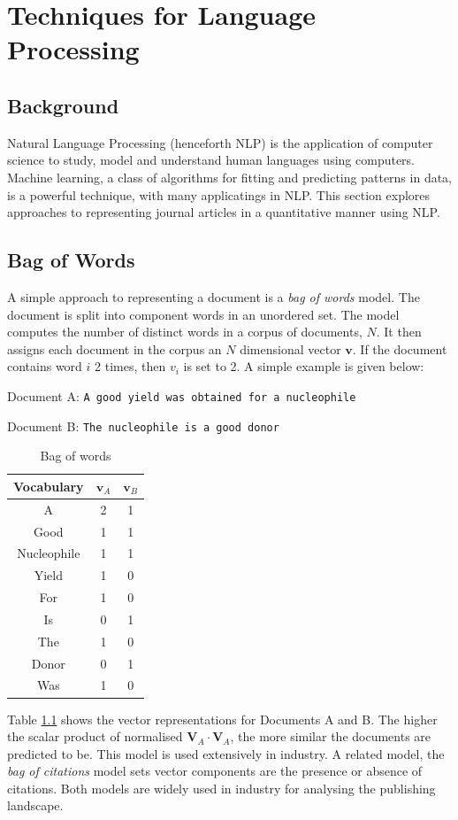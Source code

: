 \chapter{Techniques for Language Processing}
\label{chapt:NLP}
\section{Background}
Natural Language Processing (henceforth NLP) is the application of computer science to study, model and understand human languages using computers. Machine learning, a class of algorithms for fitting and predicting patterns in data, is a powerful technique, with many applicatings in NLP. This section explores approaches to representing journal articles in a quantitative manner using NLP.
\section{Bag of Words}
A simple approach to representing a document is a \emph{bag of words} model. The document is split into component words in an unordered set. The model computes the number of distinct words in a corpus of documents, $N$. It then assigns each document in the corpus an $N$ dimensional vector $\mathbf{v}$. If the document contains word $i$ 2 times, then $v_{i}$ is set to 2. A simple example is given below:

Document A: \texttt{A good yield was obtained for a nucleophile}

Document B: \texttt{The nucleophile is a good donor}
\begin{table}[H]
\label{tab:BAGOFWORDS}
\caption{Bag of words}
\begin{center}
\begin{tabular}{||c|c|c||}
\hline
Vocabulary &  $\mathbf{v}_A$ & $\mathbf{v}_B$\\
\hline
A & 2 & 1\\
Good & 1 & 1\\
Nucleophile & 1 & 1 \\
Yield & 1 & 0\\
For & 1& 0\\
Is & 0 & 1\\
The & 1 & 0\\
Donor & 0 & 1\\
Was & 1 & 0\\
\hline
\end{tabular}
\end{center}
\end{table}
Table \ref{tab:BAGOFWORDS} shows the vector representations for Documents A and B. The higher the scalar product of normalised $\mathbf{V}_A \cdot \mathbf{V}_A$, the more similar the documents are predicted to be. This model is used extensively in industry. A related model, the \emph{bag of citations} model sets vector components are the presence or absence of citations. Both models are widely used in industry for analysing the publishing landscape.
